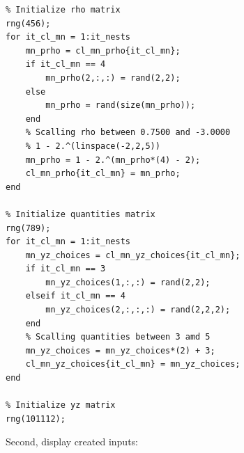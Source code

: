 \documentclass[
]{book}
\begin{document}
\begin{verbatim}
% Initialize rho matrix
rng(456);
for it_cl_mn = 1:it_nests
    mn_prho = cl_mn_prho{it_cl_mn};
    if it_cl_mn == 4
        mn_prho(2,:,:) = rand(2,2);
    else
        mn_prho = rand(size(mn_prho));
    end
    % Scalling rho between 0.7500 and -3.0000
    % 1 - 2.^(linspace(-2,2,5))
    mn_prho = 1 - 2.^(mn_prho*(4) - 2);
    cl_mn_prho{it_cl_mn} = mn_prho;
end

% Initialize quantities matrix
rng(789);
for it_cl_mn = 1:it_nests
    mn_yz_choices = cl_mn_yz_choices{it_cl_mn};
    if it_cl_mn == 3
        mn_yz_choices(1,:,:) = rand(2,2);
    elseif it_cl_mn == 4
        mn_yz_choices(2,:,:,:) = rand(2,2,2);
    end
    % Scalling quantities between 3 amd 5
    mn_yz_choices = mn_yz_choices*(2) + 3;
    cl_mn_yz_choices{it_cl_mn} = mn_yz_choices;
end

% Initialize yz matrix
rng(101112);
\end{verbatim}

Second, display created inputs:
\end{document}
